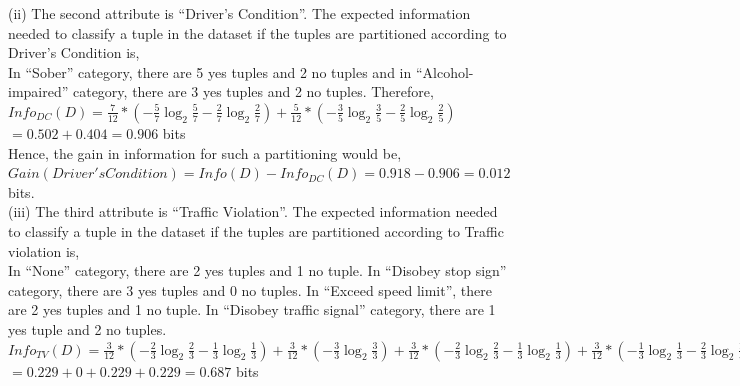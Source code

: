 \documentclass[10pt]{article}
\begin{document}
\begin{flushleft}
(ii) The second attribute is ``Driver's Condition''. The expected information needed to classify a tuple in the dataset if the tuples are partitioned according to Driver's Condition is,\\
\vspace{0.5em}
In ``Sober'' category, there are 5 yes tuples and 2 no tuples and in ``Alcohol-impaired'' category, there are 3 yes tuples and 2 no tuples. Therefore, \\
\vspace{0.5em}
\hspace{2em} $Info_{DC}(D) = \frac{7}{12} * ( - \frac{5}{7} \log_2 \frac{5}{7} - \frac{2}{7} \log_2 \frac{2}{7}) + \frac{5}{12} * (- \frac{3}{5} \log_2 \frac{3}{5} - \frac{2}{5} \log_2 \frac{2}{5})$\\
\vspace{0.5em}
\hspace{7.5em} $= 0.502 + 0.404 = 0.906$ bits\\
\vspace{0.5em}
Hence, the gain in information for such a partitioning would be, \\
\vspace{0.5em}
\hspace{2em} $Gain(Driver's Condition) = Info(D) - Info_{DC}(D) = 0.918 - 0.906 = 0.012$ bits.\\
\vspace{1em}
(iii) The third attribute is ``Traffic Violation''. The expected information needed to classify a tuple in the dataset if the tuples are partitioned according to Traffic violation is,\\
\vspace{0.5em}
In ``None'' category, there are 2 yes tuples and 1 no tuple. In ``Disobey stop sign'' category, there are 3 yes tuples and 0 no tuples. In ``Exceed speed limit'', there are 2 yes tuples and 1 no tuple. In ``Disobey traffic signal'' category, there are 1 yes tuple and 2 no tuples.\\
\vspace{0.5em}
\hspace{2em} $Info_{TV}(D) = \frac{3}{12} * ( - \frac{2}{3} \log_2 \frac{2}{3} - \frac{1}{3} \log_2 \frac{1}{3}) + \frac{3}{12} * (- \frac{3}{3} \log_2 \frac{3}{3}) + \frac{3}{12} * (- \frac{2}{3} \log_2 \frac{2}{3} - \frac{1}{3} \log_2 \frac{1}{3}) + \frac{3}{12} * (- \frac{1}{3} \log_2 \frac{1}{3} - \frac{2}{3} \log_2 \frac{2}{3})$\\
\vspace{0.5em}
\hspace{5em} $= 0.229 + 0 + 0.229 + 0.229 = 0.687$ bits\\ 

\end{flushleft}
\end{document}
